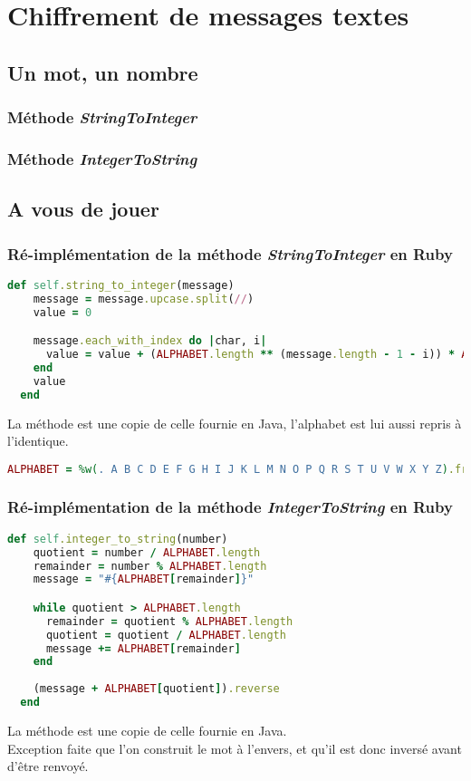 \documentclass[a4paper,10pt]{article}
\begin{document}
\clearpage
\section{Chiffrement de messages textes}
\subsection{Un mot, un nombre}
\subsubsection{Méthode \textit{StringToInteger}}
\subsubsection{Méthode \textit{IntegerToString}}

\clearpage
\subsection{A vous de jouer}
\subsubsection{Ré-implémentation de la méthode \textit{StringToInteger} en Ruby}
\begin{lstlisting}[language=Ruby]
  def self.string_to_integer(message)
    message = message.upcase.split(//)
    value = 0

    message.each_with_index do |char, i|
      value = value + (ALPHABET.length ** (message.length - 1 - i)) * ALPHABET.index(char)
    end
    value
  end
\end{lstlisting}
La méthode est une copie de celle fournie en Java, l'alphabet est lui aussi repris à l'identique.\\
\begin{lstlisting}[language=Ruby]
  ALPHABET = %w(. A B C D E F G H I J K L M N O P Q R S T U V W X Y Z).freeze
\end{lstlisting}
\bigskip

\subsubsection{Ré-implémentation de la méthode \textit{IntegerToString} en Ruby}
\begin{lstlisting}[language=Ruby]
  def self.integer_to_string(number)
    quotient = number / ALPHABET.length
    remainder = number % ALPHABET.length
    message = "#{ALPHABET[remainder]}"

    while quotient > ALPHABET.length
      remainder = quotient % ALPHABET.length
      quotient = quotient / ALPHABET.length
      message += ALPHABET[remainder]
    end
    
    (message + ALPHABET[quotient]).reverse
  end
\end{lstlisting}
La méthode est une copie de celle fournie en Java.\\
Exception faite que l'on construit le mot à l'envers, et qu'il est donc inversé avant d'être renvoyé. 
\end{document}

